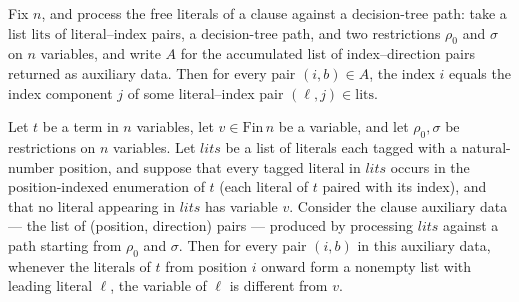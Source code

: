 \begin{lemma}
\label{SwitchingLemma.processClauseLits_aux_entries_from_lits}
\leanok
{}
Fix $n$, and process the free literals of a clause against a decision-tree path: take a
list $\mathrm{lits}$ of literal–index pairs, a decision-tree path, and two restrictions
$\rho_0$ and $\sigma$ on $n$ variables, and write $A$ for the accumulated list of
index–direction pairs returned as auxiliary data. Then for every pair $(i, b) \in A$,
the index $i$ equals the index component $j$ of some literal–index pair $(\ell, j) \in
\mathrm{lits}$.
\end{lemma}

\begin{lemma}
\label{SwitchingLemma.processClauseLits_aux_ne_nonfree}
\leanok
{}
Let $t$ be a term in $n$ variables, let $v \in \mathrm{Fin}\,n$ be a variable, and let
$\rho_0, \sigma$ be restrictions on $n$ variables. Let $\mathit{lits}$ be a list of
literals each tagged with a natural-number position, and suppose that every tagged
literal in $\mathit{lits}$ occurs in the position-indexed enumeration of $t$ (each
literal of $t$ paired with its index), and that no literal appearing in $\mathit{lits}$
has variable $v$. Consider the clause auxiliary data — the list of (position, direction)
pairs — produced by processing $\mathit{lits}$ against a path starting from $\rho_0$ and
$\sigma$. Then for every pair $(i, b)$ in this auxiliary data, whenever the literals of
$t$ from position $i$ onward form a nonempty list with leading literal $\ell$, the
variable of $\ell$ is different from $v$.
\end{lemma}

